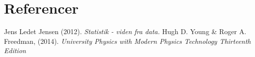 \documentclass[main]{subfiles}
\begin{document}
\section{Referencer}
Jens Ledet Jensen (2012). \textit{Statistik - viden fra data.}
Hugh D. Young & Roger A. Freedman,  (2014). \textit{University Physics with Modern Physics Technology Thirteenth Edition}
\end{document}
